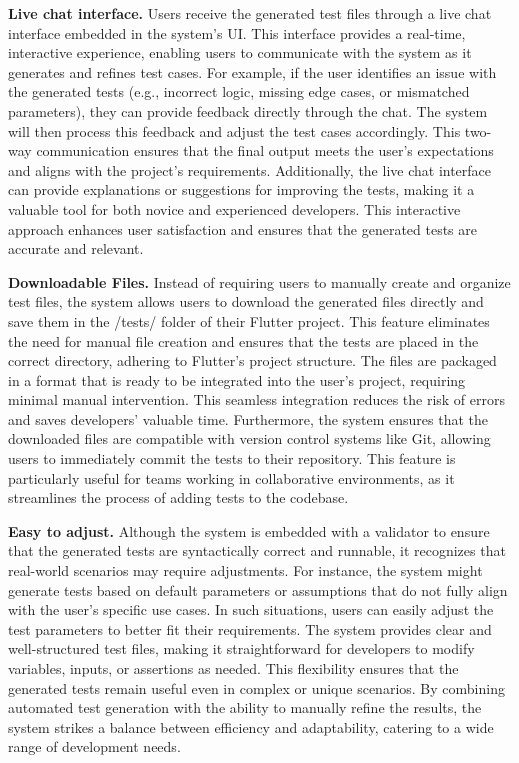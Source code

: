 \hspace{0.5cm}\textbf{Live chat interface.}     Users receive the generated test files through a live chat interface embedded in the system's UI. This interface provides a real-time, interactive experience, enabling users to communicate with the system as it generates and refines test cases. For example, if the user identifies an issue with the generated tests (e.g., incorrect logic, missing edge cases, or mismatched parameters), they can provide feedback directly through the chat. The system will then process this feedback and adjust the test cases accordingly. This two-way communication ensures that the final output meets the user's expectations and aligns with the project's requirements. Additionally, the live chat interface can provide explanations or suggestions for improving the tests, making it a valuable tool for both novice and experienced developers. This interactive approach enhances user satisfaction and ensures that the generated tests are accurate and relevant.

\hspace{0.5cm}\textbf{Downloadable Files.}     Instead of requiring users to manually create and organize test files, the system allows users to download the generated files directly and save them in the /tests/ folder of their Flutter project. This feature eliminates the need for manual file creation and ensures that the tests are placed in the correct directory, adhering to Flutter's project structure. The files are packaged in a format that is ready to be integrated into the user's project, requiring minimal manual intervention. This seamless integration reduces the risk of errors and saves developers' valuable time. Furthermore, the system ensures that the downloaded files are compatible with version control systems like Git, allowing users to immediately commit the tests to their repository. This feature is particularly useful for teams working in collaborative environments, as it streamlines the process of adding tests to the codebase.

\hspace{0.5cm}\textbf{Easy to adjust.}	Although the system is embedded with a validator to ensure that the generated tests are syntactically correct and runnable, it recognizes that real-world scenarios may require adjustments. For instance, the system might generate tests based on default parameters or assumptions that do not fully align with the user's specific use cases. In such situations, users can easily adjust the test parameters to better fit their requirements. The system provides clear and well-structured test files, making it straightforward for developers to modify variables, inputs, or assertions as needed. This flexibility ensures that the generated tests remain useful even in complex or unique scenarios. By combining automated test generation with the ability to manually refine the results, the system strikes a balance between efficiency and adaptability, catering to a wide range of development needs.

